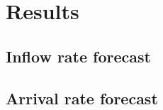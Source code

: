 \chapter{Results}
\label{cha:results}

\section{Inflow rate forecast}
\label{sec:inflow_rate_forecast_results}

\section{Arrival rate forecast}
\label{sec:arrival_rate_forecast_results}

\clearpage
